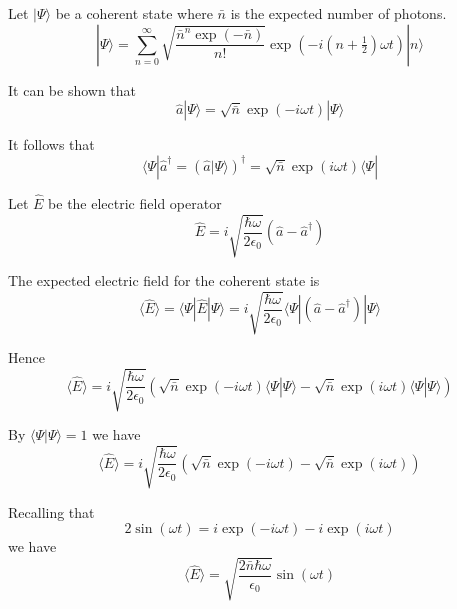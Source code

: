 \documentclass[12pt]{article}
\begin{document}
Let $|\Psi\rangle$ be a coherent state where $\bar n$ is the expected number of photons.
\begin{equation*}
|\Psi\rangle=\sum_{n=0}^\infty
\sqrt{\frac{\bar n^n\exp(-\bar n)}{n!}}
\exp\left(-i\left(n+\tfrac{1}{2}\right)\omega t\right)
|n\rangle
\end{equation*}

It can be shown that%
\begin{equation*}
\hat a|\Psi\rangle=\sqrt{\bar n}\exp(-i\omega t)|\Psi\rangle
\end{equation*}

It follows that
\begin{equation*}
\langle\Psi|\hat a^\dag=\left(\hat a|\Psi\rangle\right)^\dag=\sqrt{\bar n}\exp(i\omega t)\langle\Psi|
\end{equation*}

Let $\hat E$ be the electric field operator
\begin{equation*}
\hat E=i\sqrt{\frac{\hbar\omega}{2\epsilon_0}}
(\hat a-\hat a^\dag)
\end{equation*}

The expected electric field for the coherent state is
\begin{equation*}
\langle\hat E\rangle
=\langle\Psi|\hat E|\Psi\rangle
=i\sqrt{\frac{\hbar\omega}{2\epsilon_0}}
\langle\Psi|(\hat a-\hat a^\dag)|\Psi\rangle
\end{equation*}

Hence
\begin{equation*}
\langle\hat E\rangle
=i\sqrt{\frac{\hbar\omega}{2\epsilon_0}}
\left(\sqrt{\bar n}\exp(-i\omega t)\langle\Psi|\Psi\rangle-\sqrt{\bar n}\exp(i\omega t)\langle\Psi|\Psi\rangle\right)
\end{equation*}

By $\langle\Psi|\Psi\rangle=1$ we have
\begin{equation*}
\langle\hat E\rangle
=i\sqrt{\frac{\hbar\omega}{2\epsilon_0}}
\left(\sqrt{\bar n}\exp(-i\omega t)-\sqrt{\bar n}\exp(i\omega t)\right)
\end{equation*}

Recalling that
\begin{equation*}
2\sin(\omega t)=i\exp(-i\omega t)-i\exp(i\omega t)
\end{equation*}
we have
\begin{equation*}
\langle\hat E\rangle=\sqrt{\frac{2\bar n\hbar\omega}{\epsilon_0}}\sin(\omega t)
\end{equation*}
\end{document}
